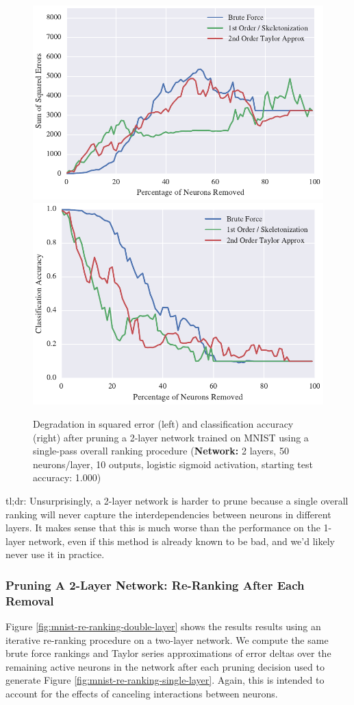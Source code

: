 \begin{figure}[!hb]
\centering
\includegraphics[width=0.49\linewidth]{png/mnist-deep-single-pass-method.pdf}
\includegraphics[width=0.49\linewidth]{png/mnist-deep-single-pass-accuracy.pdf}
\caption{Degradation in squared error (left) and classification accuracy (right) after pruning a 2-layer network trained on MNIST using a single-pass overall ranking procedure (\textbf{Network:} 2 layers, 50 neurons/layer, 10 outputs, logistic sigmoid activation, starting test accuracy: 1.000)}
\label{fig:mnist-single-ranking-double-layer}
\end{figure}

tl;dr: Unsurprisingly, a 2-layer network is harder to prune because a single overall ranking will never capture the interdependencies between neurons in different layers. It makes sense that this is much worse than the performance on the 1-layer network, even if this method is already known to be bad, and we'd likely never use it in practice. 


\subsubsection{Pruning A 2-Layer Network: Re-Ranking After Each Removal}
Figure \ref{fig:mnist-re-ranking-double-layer} shows the results results using an iterative re-ranking procedure on a two-layer network. We compute the same brute force rankings and Taylor series approximations of error deltas over the remaining active neurons in the network after each pruning decision used to generate Figure \ref{fig:mnist-re-ranking-single-layer}. Again, this is intended to account for the effects of canceling interactions between neurons. 

